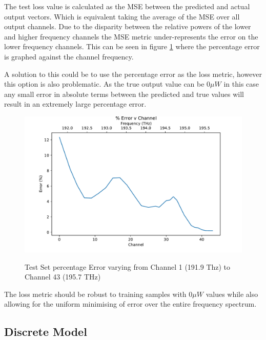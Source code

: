The test loss value is calculated as the MSE between the predicted and actual output vectors. Which is equivalent taking the average of the MSE over all output channels. Due to the disparity between the relative powers of the lower and higher frequency channels the MSE metric under-represents the error on the lower frequency channels. This can be seen in figure \ref{fig:ml_model:pct_err_freq} where the percentage error is graphed against the channel frequency.

A solution to this could be to use the percentage error as the loss metric, however this option is also problematic. As the true output value can be $0\mu W$ in this case any small error in absolute terms between the predicted and true values will result in an extremely large percentage error.

\begin{figure}[!h]
    \centering
    \caption{Test Set percentage Error varying from Channel 1 (191.9 Thz) to Channel 43 (195.7 THz)}
    \includegraphics[width = \textwidth]{project/img/ml_model/combined/pct_err_freq.pdf}
    \label{fig:ml_model:pct_err_freq}
\end{figure}

The loss metric should be robust to training samples with $0\mu W$ values while also allowing for the uniform minimising of error over the entire frequency spectrum. 



\FloatBarrier
\subsection{Discrete Model} \label{sub:sec:disc_mod}

